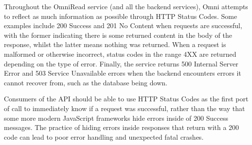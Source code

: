 

Throughout the OmniRead service (and all the backend services), Omni attempts to reflect as much information as possible through HTTP Status Codes.
Some examples include 200 Success and 201 No Content when requests are successful, with the former indicating there is some returned content in the body of the response, whilst the latter means nothing was returned.
When a request is malformed or otherwise incorrect, status codes in the range 4XX are returned depending on the type of error.
Finally, the service returns 500 Internal Server Error and 503 Service Unavailable errors when the backend encounters errors it cannot recover from, such as the database being down. 

Consumers of the API should be able to use HTTP Status Codes as the first port of call to immediately know if a request was successful, rather than the way that some more modern JavaScript frameworks hide errors inside of 200 Success messages.
The practice of hiding errors inside responses that return with a 200 code can lead to poor error handling and unexpected fatal crashes.
